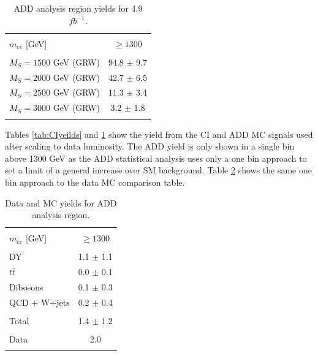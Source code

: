 	\begin{table}[h!]
	\centering %
	\begin{tabular}{l c} %
	\hline\hline \\[-2ex] %
	$m_{ee}$ [GeV] & $\geq 1300$ \\  [0.2ex]
	\hline  \\[-2ex] %
	$M_{S} = 1500$ GeV (GRW) & 94.8 $\pm$ 9.7 \\ 
	$M_{S} = 2000$ GeV (GRW) & 42.7 $\pm$ 6.5 \\ 
	$M_{S} = 2500$ GeV (GRW) & 11.3 $\pm$ 3.4 \\ 
	$M_{S} = 3000$ GeV (GRW) & 3.2 $\pm$ 1.8 \\ 
	\hline\hline  \\ %
	\end{tabular}
	\caption{ADD analysis region yields for 4.9 $fb^{-1}$.} %
	\label{tab:ADDyeilds}
	\end{table}


	Tables \ref{tab:CIyeilds} and \ref{tab:ADDyeilds} show the yield from the CI and ADD MC signals used after scaling to data luminosity. The ADD yield is only shown in a single bin above 1300 GeV as the ADD statistical analysis uses only a one bin approach to set a limit of a general increase over SM background. Table \ref{tab:dataMCADDyeilds} shows the same one bin approach to the data MC comparison table.

	\begin{table}[h!]
	\centering %
	\begin{tabular}{l c} %
	\hline\hline \\[-2ex] %
	$m_{ee}$ [GeV] & $\geq 1300$ \\  [0.2ex]
	\hline  \\[-2ex] %
	DY & 1.1 $\pm$ 1.1 \\ 
	$t\bar{t}$ & 0.0 $\pm$ 0.1 \\ 
	Dibosons & 0.1 $\pm$ 0.3 \\ 
	QCD + W+jets & 0.2 $\pm$ 0.4 \\ 
	\hline  \\[-2ex] %
	Total & 1.4 $\pm$ 1.2 \\ 
	\hline  \\[-2ex] %
	Data & 2.0 \\ 
	\hline\hline  \\ %
	\end{tabular}
	\caption{Data and MC yields for ADD analysis region.} %
	\label{tab:dataMCADDyeilds}
	\end{table}



